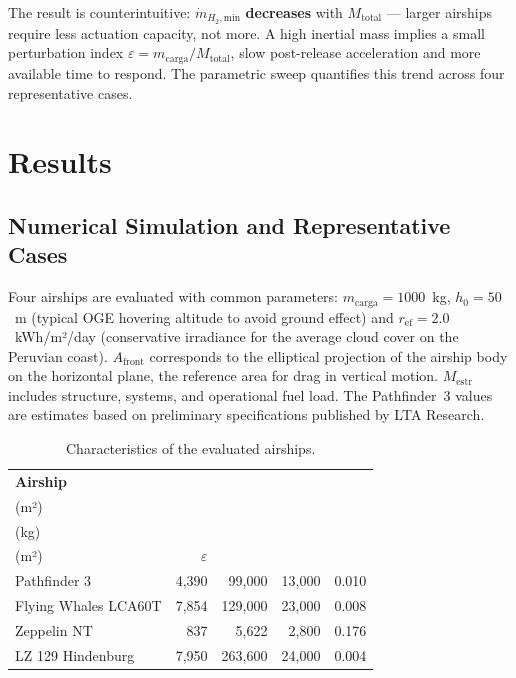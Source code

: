 \documentclass[aerospace,article,submit,pdftex,moreauthors]{Definitions/mdpi}
\newcommand{\dotmmin}{\dot{m}_{H_2,\text{min}}}
\begin{document}
The result is counterintuitive: $\dotmmin$ \textbf{decreases} with $M_\text{total}$ — larger airships require less actuation capacity, not more. A high inertial mass implies a small perturbation index $\varepsilon = m_\text{carga}/M_\text{total}$, slow post-release acceleration and more available time to respond. The parametric sweep quantifies this trend across four representative cases.

\section{Results}

\subsection{Numerical Simulation and Representative Cases}
Four airships are evaluated with common parameters: $m_\text{carga}=1000$~kg, $h_0=50$~m (typical OGE hovering altitude to avoid ground effect) and $r_\text{ef}=2.0$~kWh/m²/day (conservative irradiance for the average cloud cover on the Peruvian coast). $A_\text{front}$ corresponds to the elliptical projection of the airship body on the horizontal plane, the reference area for drag in vertical motion. $M_\text{estr}$ includes structure, systems, and operational fuel load. The Pathfinder~3 values are estimates based on preliminary specifications published by LTA Research.

\begin{table}[H]
\centering
\caption{Characteristics of the evaluated airships.}
\label{tab:dirigibles}
\renewcommand{\arraystretch}{1.2}
\setlength{\tabcolsep}{4pt}
\begin{tabular}{@{} l r r r c @{}}
\toprule
\textbf{Airship} & \makecell{$A_\text{front}$\\(m²)} & \makecell{$M_\text{estr}$\\(kg)} & \makecell{$A_\text{total}$\\(m²)} & $\varepsilon$ \\
\midrule
Pathfinder 3         &  4{,}390 &  99{,}000 & 13{,}000 & 0.010 \\
Flying Whales LCA60T &  7{,}854 & 129{,}000 & 23{,}000 & 0.008 \\
Zeppelin NT          &    837   &   5{,}622 &  2{,}800 & 0.176 \\
LZ 129 Hindenburg    &  7{,}950 & 263{,}600 & 24{,}000 & 0.004 \\
\bottomrule
\end{tabular}
\end{table}
\end{document}
